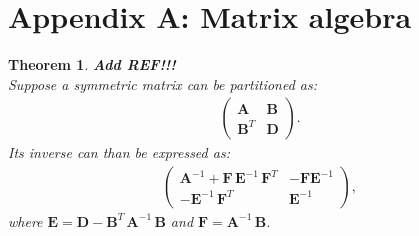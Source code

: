 \documentclass[a4paper]{article}
\theoremstyle{myexamplestyle}
\newtheorem{ther}{Theorem}
\def\reminder#1{\marginpar{\rule[0pt]{1mm}{11pt}}\textbf{#1}}
\begin{document}


\newpage
\setlength{\bibsep}{2pt}


% 
% 
% 
% 




\newpage
\section{Appendix A: Matrix algebra}


\begin{ther} \label{theo.inverse22blockMatrix} \reminder{Add REF!!!}
\\
Suppose a symmetric matrix can be partitioned as:
\begin{eqnarray*}
\left( \begin{array}{cc} \mathbf{A} & \mathbf{B} \\ \mathbf{B}^T & \mathbf{D} \end{array} \right).
\end{eqnarray*}
Its inverse can than be expressed as:
\begin{eqnarray*}
\left( \begin{array}{cc} \mathbf{A}^{-1} + \mathbf{F} \, \mathbf{E}^{-1} \, \mathbf{F}^T  & - \mathbf{F} \mathbf{E}^{-1}
\\
- \mathbf{E}^{-1} \, \mathbf{F}^T &  \mathbf{E}^{-1}
\end{array}
\right),
\end{eqnarray*}
where $\mathbf{E} = \mathbf{D} - \mathbf{B}^T \, \mathbf{A}^{-1} \, \mathbf{B}$ and
$\mathbf{F} = \mathbf{A}^{-1} \, \mathbf{B}$.
\end{ther}
\end{document}
